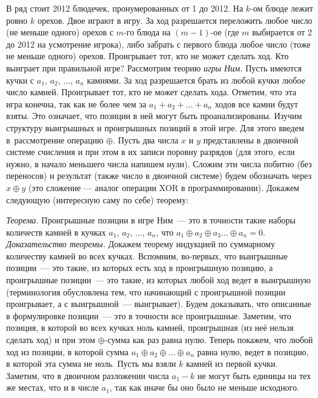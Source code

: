 \problem{}
В ряд стоит 2012 блюдечек, пронумерованных от 1 до 2012.
На $k$-ом блюде лежит ровно $k$ орехов.
Двое играют в игру.
За ход разрешается переложить любое число (не меньше одного) орехов с $m$-го
блюда на $(m - 1)$-ое (где $m$ выбирается от 2 до 2012 на усмотрение игрока),
либо забрать с первого блюда любое число (тоже не меньше одного) орехов.
Проигрывает тот, кто не может сделать ход.
Кто выиграет при правильной игре?
\solution
Рассмотрим теорию \emph{игры Ним.}
Пусть имеются кучки с $a_1$, $a_2$, $\ldots$, $a_n$ камнями.
За ход разрешается брать из любой кучки любое число камней.
Проигрывает тот, кто не может сделать хода.
Отметим, что эта игра конечна, так как не более чем за
$a_1 + a_2 + \ldots + a_n$ ходов все камни будут взяты.
Это означает, что позиции в ней могут быть проанализированы.
Изучим структуру выигрышных и проигрышных позиций в этой игре.
Для этого введем в~рассмотрение операцию $\oplus$.
Пусть два числа $x$ и $y$ представлены в двоичной системе счисления и при этом
в их записи поровну разрядов
(для этого, если нужно, в начало меньшего числа напишем нули).
Сложим эти числа побитно (без переносов) и результат
(также число в двоичной системе) будем обозначать через $x \oplus y$
(это сложение --- аналог операции XOR в программировании).
Докажем следующую (интересную саму по себе) теорему:
\par
\emph{Теорема.}
Проигрышные позиции в игре Ним~--- это в точности такие наборы количеств
камней в кучках $a_1$, $a_2$, $\ldots$, $a_n$, что
$a_1 \oplus a_2 \oplus a_3 \ldots \oplus a_n = 0$.
\\\emph{Доказательство теоремы.}
Докажем теорему индукцией по суммарному количеству камней во всех кучках.
Вспомним, во-первых, что выигрышные позиции~--- это такие, из которых есть ход
в проигрышную позицию, а проигрышные позиции~--- это такие, из которых любой
ход ведет в выигрышную
(терминология обусловлена тем, что начинающий с проигрышной позиции
проигрывает, а с выигрышной~--- выигрывает).
Будем доказывать, что описанные в формулировке позиции~--- это в точности все
проигрышные.
Заметим, что позиция, в которой во всех кучках ноль камней, проигрышная
(из неё нельзя сделать ход) и при этом $\oplus$-сумма как раз равна нулю.
Теперь покажем, что любой ход из позиции, в которой
сумма $a_1 \oplus a_2 \oplus \ldots \oplus a_n$ равна нулю, ведет в позицию,
в которой эта сумма не ноль.
Пусть мы взяли $k$ камней из первой кучки.
Заметим, что в двоичном разложении числа $a_1 - k$ не могут быть единицы на тех
же местах, что и в числе $a_1$, так как иначе бы оно было не меньше исходного.
